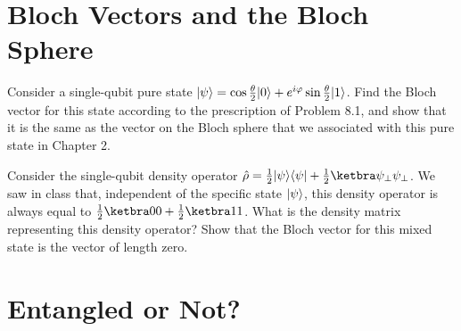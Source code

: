 \documentclass{../phys084}
\begin{document}
\begin {solution}
  \begin {problems}
  \item
  \item
  \end {problems}
\end {solution}

\section {Bloch Vectors and the Bloch Sphere}

\begin {exercise}
  \begin {problems}
  \item Consider a single-qubit pure state
    \(\lvert\psi\rangle = \cos \frac \theta 2 \lvert0\rangle + e^{i \varphi} \sin
    \frac \theta 2 \lvert1\rangle\).  Find the Bloch vector for this state
    according to the prescription of Problem 8.1, and show that it is
    the same as the vector on the Bloch sphere that we associated with
    this pure state in Chapter 2.
  \item Consider the single-qubit density operator
    \(\hat \rho = \frac 1 2 \ket \psi \bra \psi + \frac 1 2 \proj
    {\psi_{\perp}}\).  We saw in class that, independent of the
    specific state \(\lvert\psi\rangle\), this density operator is always
    equal to \(\frac 1 2 \proj 0 + \frac 1 2 \proj 1\).  What is the
    density matrix representing this density operator?  Show that the
    Bloch vector for this mixed state is the vector of length zero.
  \end {problems}
\end {exercise}

\begin {solution}
  \begin {problems}
  \item
  \item
  \end {problems}
\end {solution}

\section {Entangled or Not?}
\end{document}
